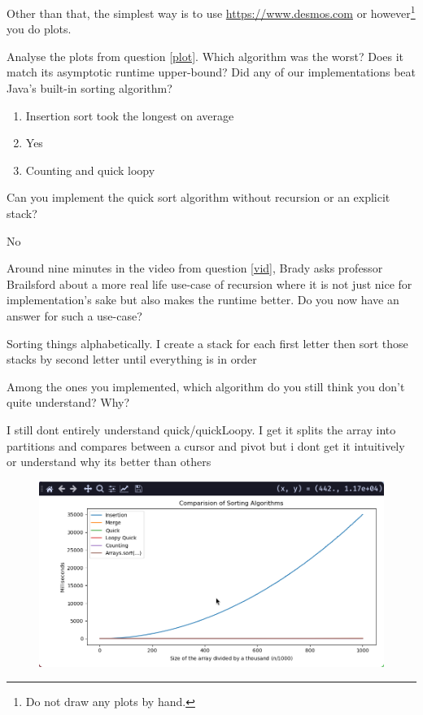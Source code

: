 \documentclass{homework}
\begin{document}
Other than that, the simplest way is to use
\url{https://www.desmos.com} or however\footnote{Do not draw any
  plots by hand.} you do plots.

\question Analyse the plots from question \ref{plot}. Which algorithm was the worst? Does it match its asymptotic runtime upper-bound? Did any of our implementations beat Java's built-in sorting algorithm?

\begin{sol}
  \begin{enumerate}
    \item Insertion sort took the longest on average
    \item Yes
    \item Counting and quick loopy
  \end{enumerate}
\end{sol}

\question Can you implement the quick sort algorithm without recursion or an
explicit stack?

\begin{sol}
  No
\end{sol}

\question Around nine minutes in the video from question \ref{vid}, Brady asks professor Brailsford about a more real life use-case of recursion where it is not just nice for implementation's sake but also makes the runtime better. Do you now have an answer for such a use-case?

\begin{sol}
  Sorting things alphabetically. I create a stack for each first letter then sort those stacks by second letter until everything is in order
\end{sol}

\question Among the ones you implemented, which algorithm do you still think
you don't quite understand? Why?

\begin{sol}
  I still dont entirely understand quick/quickLoopy. I get it splits the array into partitions and compares between a cursor and pivot but i dont get it intuitively or understand why its better than others
\end{sol}

\begin{figure}
  \includegraphics[width=\linewidth]{plotbig.png}
\end{figure}
\end{document}
